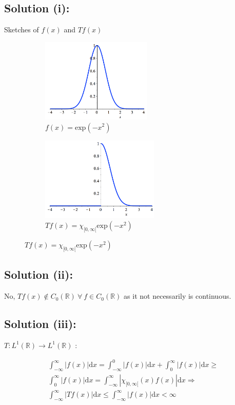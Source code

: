 \documentclass{article}
\begin{document}
\subsection*{Solution (i):}
Sketches of $f(x)$ and $Tf(x)$
\begin{figure}[H]
\centering
    \begin{subfigure}{0.495\textwidth}
    \includegraphics[width=0.9\linewidth, height=4cm]{fig/sketch1}
    \caption*{$f(x)=\text{exp}(-x^2)$}
    \end{subfigure}
    \begin{subfigure}{0.495\textwidth}
    \includegraphics[width=0.9\linewidth, height=4cm]{fig/sketch2}
    \caption*{$Tf(x)=\chi_{[0,\infty[}\text{exp}(-x^2)$}
    \end{subfigure}
\end{figure}


\subsection*{Solution (ii):}

No, $Tf(x) \notin C_0(\mathbb{R}) \: \forall \: f \in C_0(\mathbb{R})$ as it not necessarily is continuous.

\subsection*{Solution (iii):}
$T:L^1(\mathbb{R}) \rightarrow L^1(\mathbb{R})$ : 

\begin{gather*}
    \int_{-\infty}^{\infty} |f(x)| \text{d}x = \int_{-\infty}^{0} |f(x)| \text{d}x + \int_{0}^{\infty} |f(x)| \text{d}x \geq \\
    \int_{0}^{\infty} |f(x)| \text{d}x = \int_{-\infty}^{\infty} |\chi_{[0,\infty[}(x)f(x)| \text{d}x \Rightarrow \\
    \int_{-\infty}^{\infty} |Tf(x)| \text{d}x \leq  \int_{-\infty}^{\infty} |f(x)| \text{d}x < \infty
\end{gather*}
\end{document}
